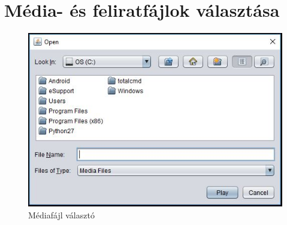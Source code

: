 \section{Média- és feliratfájlok választása}

\begin{figure}[!h]
  \includegraphics[width=\linewidth]{images/chooser_screen.jpg}
  \caption{Médiafájl választó}
  \label{fig:chooser_screen}
\end{figure}

